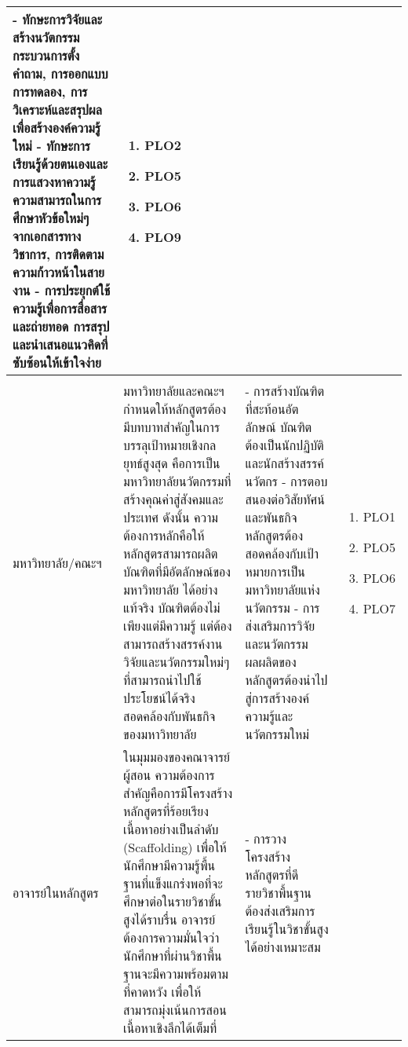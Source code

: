 \begin{longtable}{| >{\raggedright}p{} | >{\raggedright}p{} | >{\raggedright}p{} | >{\centering\arraybackslash}p{} |}
- ทักษะการวิจัยและสร้างนวัตกรรม กระบวนการตั้งคำถาม, การออกแบบการทดลอง, การวิเคราะห์และสรุปผลเพื่อสร้างองค์ความรู้ใหม่ \newline
- ทักษะการเรียนรู้ด้วยตนเองและการแสวงหาความรู้ ความสามารถในการศึกษาหัวข้อใหม่ๆ จากเอกสารทางวิชาการ, การติดตามความก้าวหน้าในสายงาน \newline
- การประยุกต์ใช้ความรู้เพื่อการสื่อสารและถ่ายทอด การสรุปและนำเสนอแนวคิดที่ซับซ้อนให้เข้าใจง่าย &
\vspace{-0.5cm}
\begin{enumerate}[label={}]
	\item PLO2
	\item PLO5
	\item PLO6
	\item PLO9
\end{enumerate}
 \\
    \hline
    \multicolumn{4}{|l|}{\textbf{ผู้มีส่วนได้ส่วนเสียภายใน (Internal Stakeholders)}} \\
    \hline
มหาวิทยาลัย/คณะฯ & 
มหาวิทยาลัยและคณะฯ กำหนดให้หลักสูตรต้องมีบทบาทสำคัญในการบรรลุเป้าหมายเชิงกลยุทธ์สูงสุด คือการเป็นมหาวิทยาลัยนวัตกรรมที่สร้างคุณค่าสู่สังคมและประเทศ  ดังนั้น ความต้องการหลักคือให้หลักสูตรสามารถผลิตบัณฑิตที่มีอัตลักษณ์ของมหาวิทยาลัย  ได้อย่างแท้จริง บัณฑิตต้องไม่เพียงแต่มีความรู้ แต่ต้องสามารถสร้างสรรค์งานวิจัยและนวัตกรรมใหม่ๆ ที่สามารถนำไปใช้ประโยชน์ได้จริง สอดคล้องกับพันธกิจของมหาวิทยาลัย &
- การสร้างบัณฑิตที่สะท้อนอัตลักษณ์ บัณฑิตต้องเป็นนักปฏิบัติและนักสร้างสรรค์นวัตกร  \newline
- การตอบสนองต่อวิสัยทัศน์และพันธกิจ หลักสูตรต้องสอดคล้องกับเป้าหมายการเป็นมหาวิทยาลัยแห่งนวัตกรรม  \newline
- การส่งเสริมการวิจัยและนวัตกรรม ผลผลิตของหลักสูตรต้องนำไปสู่การสร้างองค์ความรู้และนวัตกรรมใหม่  &
\begin{enumerate}[label={}]
	\item PLO1
	\item PLO5
	\item PLO6
	\item PLO7
\end{enumerate}
 \\
    \hline
    อาจารย์ในหลักสูตร &
ในมุมมองของคณาจารย์ผู้สอน ความต้องการสำคัญคือการมีโครงสร้างหลักสูตรที่ร้อยเรียงเนื้อหาอย่างเป็นลำดับ (Scaffolding) เพื่อให้นักศึกษามีความรู้พื้นฐานที่แข็งแกร่งพอที่จะศึกษาต่อในรายวิชาขั้นสูงได้ราบรื่น อาจารย์ต้องการความมั่นใจว่านักศึกษาที่ผ่านวิชาพื้นฐานจะมีความพร้อมตามที่คาดหวัง เพื่อให้สามารถมุ่งเน้นการสอนเนื้อหาเชิงลึกได้เต็มที่  &
- การวางโครงสร้างหลักสูตรที่ดี รายวิชาพื้นฐานต้องส่งเสริมการเรียนรู้ในวิชาขั้นสูงได้อย่างเหมาะสม \newline

\end{longtable}
